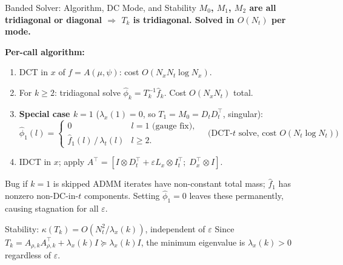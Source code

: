 \documentclass[10pt,aspectratio=169]{beamer}
\newcommand{\eps}{\varepsilon}
\newcommand{\lx}{\lambda_x}
\newcommand{\lt}{\lambda_t}
\newcommand{\Dt}{D_t}
\newcommand{\DtT}{D_t^{\!\top}}
\newcommand{\ItT}{I_t^{\!\top}}
\newcommand{\DxT}{D_x^{\!\top}}
\newcommand{\Lx}{L_x}
\newcommand{\kron}{\otimes}
\begin{document}
\begin{frame}{Banded Solver: Algorithm, DC Mode, and Stability}
  \textbf{$M_0$, $M_1$, $M_2$ are all tridiagonal or diagonal
  $\Rightarrow$ $T_k$ is tridiagonal. Solved in $O(N_t)$ per mode.}

  \medskip
  \textbf{Per-call algorithm:}
  \begin{enumerate}
    \item DCT in $x$ of $f=A(\mu,\psi)$: cost $O(N_xN_t\log N_x)$.
    \item For $k\geq 2$: tridiagonal solve $\hat\phi_k = T_k^{-1}\hat f_k$.
          Cost $O(N_xN_t)$ total.
    \item \textbf{Special case $k=1$} ($\lx(1)=0$, so $T_1 = M_0 = \Dt\DtT$, singular):
    \[
      \hat\phi_1(l) = \begin{cases}0 & l=1\text{ (gauge fix)},\\
      \hat f_1(l)\,/\,\lt(l) & l\geq 2.\end{cases}
      \quad\text{(DCT-}t\text{ solve, cost }O(N_t\log N_t))
    \]
    \item IDCT in $x$; apply $A^\top = [I\kron\DtT + \eps\Lx\kron\ItT;\;\DxT\kron I]$.
  \end{enumerate}

  \medskip
  \begin{alertblock}{Bug if $k=1$ is skipped}
    ADMM iterates have non-constant total mass; $\hat f_1$ has nonzero
    non-DC-in-$t$ components. Setting $\hat\phi_1=0$ leaves these permanently,
    causing stagnation for all $\eps$.
  \end{alertblock}

  \medskip
  \begin{block}{Stability: $\kappa(T_k) = O(N_t^2/\lx(k))$, independent of $\eps$}
    Since $T_k = A_{\rho,k}A_{\rho,k}^\top + \lx(k)I \succeq \lx(k)I$,
    the minimum eigenvalue is $\lx(k)>0$ regardless of $\eps$.
  \end{block}
\end{frame}
\end{document}
